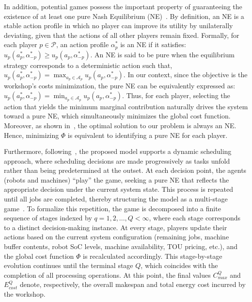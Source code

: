 \documentclass[preprint, 3p, review, 12pt]{elsarticle}
\begin{document}
In addition, potential games possess the important property of guaranteeing the existence of at least one pure Nash Equilibrium (NE)~\cite{c9722354, WU2020208}. By definition, an NE is a stable action profile in which no player can improve its utility by unilaterally deviating, given that the actions of all other players remain fixed. Formally, for each player $p \in \mathcal{P}$, an action profile $\alpha_{p}^*$ is an NE if it satisfies: $u_p(a_p^*,\alpha_{-p}^*) \ge u_p(a_p,\alpha_{-p}^*)$. An NE is said to be pure when the equilibrium strategy corresponds to a deterministic action such that, $u_p(a_p^*,\alpha_{-p}^*) = \max_{a_p \in \mathcal{A}_p}{u_p(a_p,\alpha_{-p}^*)}$. In our context, since the objective is the workshop's costs minimization, the pure NE can be equivalently expressed as: $u_p(a_p^*,\alpha_{-p}^*) = \min_{a_p \in \mathcal{A}_p}{u_p(a_p,\alpha_{-p}^*)}$. Thus, for each player, selecting the action that yields the minimum marginal contribution naturally drives the system toward a pure NE, which simultaneously minimizes the global cost function. Moreover, as shown in~\cite{SANOGO2025111366}, the optimal solution to our problem is always an NE. Hence, minimizing $\Phi$ is equivalent to identifying a pure NE for each player.

Furthermore, following~\cite{SANOGO2025111366}, the proposed model supports a dynamic scheduling approach, where scheduling decisions are made progressively as tasks unfold rather than being predetermined at the outset. At each decision point, the agents (robots and machines) “play” the game, seeking a pure NE that reflects the appropriate decision under the current system state. This process is repeated until all jobs are completed, thereby structuring the model as a multi-stage game~\cite{abreu1988structure}. To formalize this repetition, the game is decomposed into a finite sequence of stages indexed by $q = 1, 2, ..., Q<\infty$, where each stage corresponds to a distinct decision-making instance. At every stage, players update their actions based on the current system configuration (remaining jobs, machine buffer contents, robot SoC levels, machine availability, TOU pricing, etc.), and the global cost function $\Phi$ is recalculated accordingly. This stage-by-stage evolution continues until the terminal stage $Q$, which coincides with the completion of all processing operations. At this point, the final values $C_{max}^Q$ and $E_{cost}^Q$ denote, respectively, the overall makespan and total energy cost incurred by the workshop.
\end{document}
